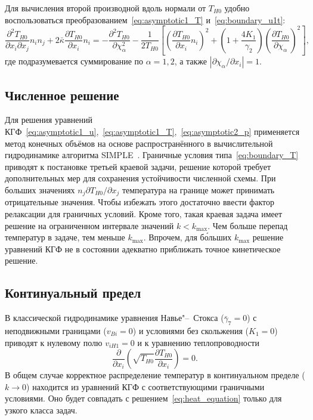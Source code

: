 \documentclass[
aps,%
12pt,%
final,%
notitlepage,%
oneside,%
onecolumn,%
nobibnotes,%
nofootinbib,%
superscriptaddress,%
noshowpacs,%
showkeys,%
floatfix,%
tightenlines,%
centertags]%
{revtex4}
\newcommand{\pder}[2][]{\frac{\partial#1}{\partial#2}}
\newcommand{\pderdual}[2][]{\frac{\partial^2#1}{\partial#2^2}}
\newcommand{\pderder}[3][]{\frac{\partial^2#1}{\partial#2\partial#3}}
\newcommand{\Pder}[2][]{\partial#1/\partial#2}
\begin{document}
Для вычисления второй производной вдоль нормали от \(T_{H0}\)
удобно воспользоваться преобразованием~\eqref{eq:asymptotic1_T} и~\eqref{eq:boundary_u1t}:
\begin{equation}\label{eq:Tnn}
    \pderder[T_{H0}]{x_i}{x_j}n_i n_j + 2\bar\kappa\pder[T_{H0}]{x_i}n_i =
    - \pderdual[T_{H0}]{\chi_\alpha} - \frac1{2T_{H0}} \left[
        \left(\pder[T_{H0}]{x_i}n_i\right)^2 +
        \left(1+\frac{4K_1}{\gamma_2}\right) \left(\pder[T_{H0}]{\chi_\alpha}\right)^2
    \right],
\end{equation}
где подразумевается суммирование по \(\alpha=1,2\), а также \(|\Pder[\chi_\alpha]{x_i}| = 1\).

\subsection{Численное решение}

Для решения уравнений КГФ~\eqref{eq:asymptotic1_u},~\eqref{eq:asymptotic1_T},~\eqref{eq:asymptotic2_p}
применяется метод конечных объёмов на основе распространённого в вычислительной гидродинамике алгоритма SIMPLE~\cite{Aoki2007}.
Граничные условия типа~\eqref{eq:boundary_T} приводят к постановке третьей краевой задачи,
решение которой требует дополнительных мер для сохранения устойчивости численной схемы.
При больших значениях \(n_j\Pder[T_{H0}]{x_j}\) температура на границе может принимать отрицательные значения.
Чтобы избежать этого достаточно ввести фактор релаксации для граничных условий.
Кроме того, такая краевая задача имеет решение на ограниченном интервале значений \(k<k_{\max}\).
Чем больше перепад температур в задаче, тем меньше \(k_{\max}\).
Впрочем, для б\'{о}льших \(k_{\max}\) решение уравнений КГФ не в состоянии адекватно приближать
точное кинетическое решение.

\subsection{Континуальный предел}

В классической гидродинамике уравнения Навье"--~Стокса (\(\bar{\gamma}_7=0\))
с неподвижными границами (\(v_{Bi}=0\)) и условиями без скольжения (\(K_1=0\))
приводят к нулевому полю \(v_{iH1}=0\) и к уравнению теплопроводности
\begin{equation}\label{eq:heat_equation}
    \pder{x_i}\left(\sqrt{T_{H0}}\pder[T_{H0}]{x_i}\right) = 0.
\end{equation}
В общем случае корректное распределение температур в континуальном пределе (\(k\to0\))
находится из уравнений КГФ с соответствующими граничными условиями.
Оно будет совпадать с решением~\eqref{eq:heat_equation} только для узкого класса задач.
\end{document}
